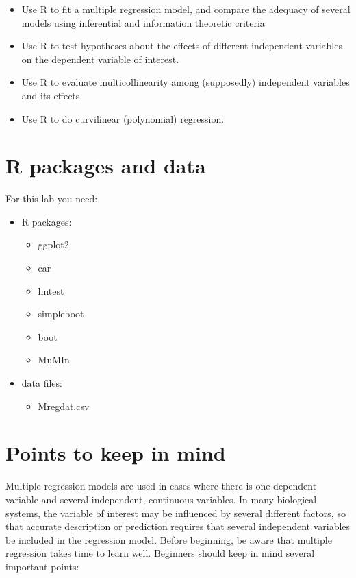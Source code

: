 \documentclass[
  12pt,
]{book}
\providecommand{\tightlist}{%
  \setlength{\itemsep}{0pt}\setlength{\parskip}{0pt}}
\begin{document}
\begin{itemize}
\tightlist
\item
  Use R to fit a multiple regression model, and compare the adequacy of several models using inferential and information theoretic criteria
\item
  Use R to test hypotheses about the effects of different independent variables on the dependent variable of interest.
\item
  Use R to evaluate multicollinearity among (supposedly) independent variables and its effects.
\item
  Use R to do curvilinear (polynomial) regression.
\end{itemize}

\hypertarget{set-reg-mul}{%
\section{R packages and data}\label{set-reg-mul}}

For this lab you need:

\begin{itemize}
\tightlist
\item
  R packages:

  \begin{itemize}
  \tightlist
  \item
    ggplot2
  \item
    car
  \item
    lmtest
  \item
    simpleboot
  \item
    boot
  \item
    MuMIn
  \end{itemize}
\item
  data files:

  \begin{itemize}
  \tightlist
  \item
    Mregdat.csv
  \end{itemize}
\end{itemize}

\hypertarget{points-to-keep-in-mind}{%
\section{Points to keep in mind}\label{points-to-keep-in-mind}}

Multiple regression models are used in cases where there is one dependent variable and several independent, continuous variables. In many biological systems, the variable of interest may be influenced by several different factors, so that accurate description or prediction requires that several independent variables be included in the regression model. Before beginning, be aware that multiple regression takes time to learn well. Beginners should keep in mind several important points:
\end{document}
